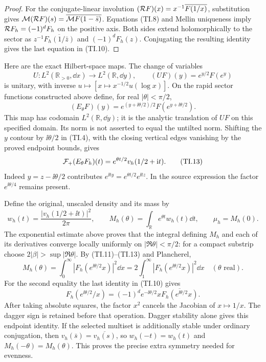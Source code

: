 \begin{proof}
For the conjugate-linear involution
$({\cal R}F)(x)=x^{-1}\overline{F(1/x)}$, substitution gives
$\mathcal M({\cal R}F)(s)=\overline{\mathcal M F(1-\bar s)}$. Equations (TI.8) and
Mellin uniqueness imply ${\cal R}F_h=(-1)^dF_h$ on the positive axis.
Both sides extend holomorphically to the sector as
$z^{-1}\overline{F_h(1/\bar z)}$ and $(-1)^dF_h(z)$.
Conjugating the resulting identity gives the last equation in (TI.10).
\end{proof}

Here are the exact Hilbert-space maps. The change of variables
\begin{equation}
 U:L^2(\mathbb R_{>0},\dd x)\longrightarrow L^2(\mathbb R,\dd y),
 \qquad (UF)(y)=e^{y/2}F(e^y) \tag{TI.11}
\end{equation}
is unitary, with inverse $u\mapsto[x\mapsto x^{-1/2}u(\log x)]$.
On the rapid sector functions constructed above define, for real
$|\theta|<\pi/2$,
\begin{equation}
 (E_\theta F)(y)=e^{(y+\ii\theta/2)/2}
 F(e^{y+\ii\theta/2}). \tag{TI.12}
\end{equation}
This map has codomain $L^2(\mathbb R,\dd y)$; it is the analytic
translation of $UF$ on this specified domain. Its norm is not asserted
to equal the untilted norm. Shifting the $y$ contour by $\ii\theta/2$
in (TI.4), with the closing vertical edges vanishing by the proved
endpoint bounds, gives
\begin{equation}
 \mathcal F_+(E_\theta F_h)(t)=e^{\theta t/2}v_h(1/2+\mathrm i t). \tag{TI.13}
\end{equation}
Indeed $y=z-\ii\theta/2$ contributes
$e^{\ii ty}=e^{\theta t/2}e^{\ii tz}$. In the source expression
the factor $e^{\ii\theta/4}$ remains present.

Define the original, unscaled density and its mass by
\begin{equation}
 w_h(t)=\frac{|v_h(1/2+\ii t)|^2}{2\pi},\qquad
 M_h(\theta)=\int_{\mathbb R}e^{\theta t}w_h(t)\dd t,
 \qquad \mu_h=M_h(0). \tag{TI.14}
\end{equation}
The exponential estimate above proves that the integral defining
$M_h$ and each of its derivatives converge locally uniformly on
$|\Re\theta|<\pi/2$: for a compact substrip choose
$2|\beta|>\sup|\Re\theta|$. By (TI.11)--(TI.13) and Plancherel,
\begin{equation}
 M_h(\theta)=\int_0^\infty|F_h(e^{\ii\theta/2}x)|^2\dd x
 =2\int_1^\infty|F_h(e^{\ii\theta/2}x)|^2\dd x
 \quad (\theta\text{ real}). \tag{TI.15}
\end{equation}
For the second equality the last identity in (TI.10) gives
\[
 F_h(e^{\ii\theta/2}/x)=(-1)^d e^{-\ii\theta/2}x
 \overline{F_h(e^{\ii\theta/2}x)}.
\]
After taking absolute squares, the factor $x^2$ cancels the Jacobian
of $x\mapsto1/x$. The dagger sign is retained before that operation.
Dagger stability alone gives this endpoint identity. If the selected
multiset is additionally stable under ordinary conjugation, then
$v_h(\bar s)=\overline{v_h(s)}$, so $w_h(-t)=w_h(t)$ and
$M_h(-\theta)=M_h(\theta)$. This proves the precise extra symmetry
needed for evenness.

